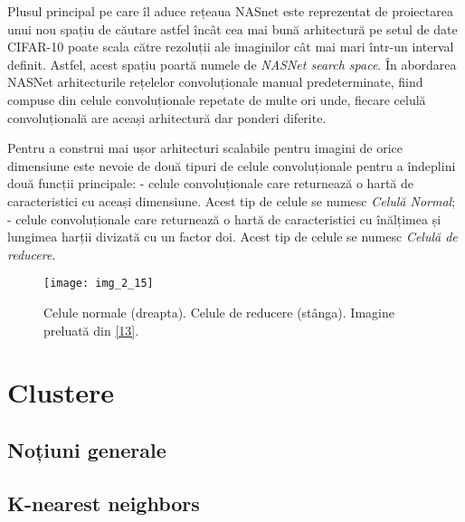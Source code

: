 Plusul principal pe care îl aduce rețeaua NASnet este reprezentat de proiectarea unui nou spațiu de căutare astfel încât cea mai bună arhitectură pe setul de date CIFAR-10 poate scala către rezoluții ale imaginilor cât mai mari într-un interval definit. Astfel, acest spațiu poartă numele de \textit{NASNet search space}. În abordarea NASNet arhitecturile rețelelor convoluționale manual predeterminate, fiind compuse din celule convoluționale repetate de multe ori unde, fiecare celulă convoluțională are aceași arhitectură dar ponderi diferite.

Pentru a construi mai ușor arhitecturi scalabile pentru imagini de orice dimensiune este nevoie de două tipuri de celule convoluționale pentru a îndeplini două funcții principale: - celule convoluționale care returnează o hartă de caracteristici cu aceași dimensiune. Acest tip de celule se numesc \textit{Celulă Normal}; - celule convoluționale care returnează o hartă de caracteristici cu înălțimea și lungimea harții divizată cu un factor doi. Acest tip de celule se numesc \textit{Celulă de reducere}.

\begin{figure}[!h]
	\centering
	\texttt{[image: img\_2\_15]}
	\caption[Celule normale și de reducere]{Celule normale (dreapta). Celule de reducere (stânga). Imagine preluată din \hyperlink{Zoph2018LearningTA}{[13]}.}
\end{figure}  

\section{Clustere}

\subsection{Noțiuni generale}

\subsection{K-nearest neighbors}
